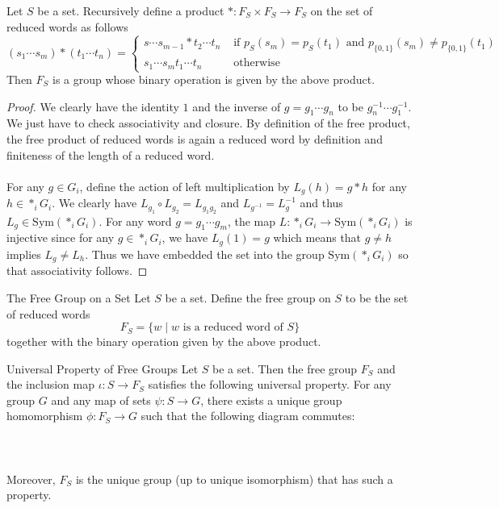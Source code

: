 \documentclass[a4paper]{article}
\begin{document}
\begin{prp}{}{} Let $S$ be a set. Recursively define a product $\ast:F_S\times F_S\to F_S$ on the set of reduced words as follows $$(s_1\cdots s_m)\ast(t_1\cdots t_n)=\begin{cases}
s\cdots s_{m-1}\ast t_2\cdots t_n & \text{ if }p_S(s_m)=p_S(t_1)\text{ and }p_{\{0,1\}}(s_m)\neq p_{\{0,1\}}(t_1)\\
s_1\cdots s_mt_1\cdots t_n& \text{ otherwise }
\end{cases}$$
Then $F_S$ is a group whose binary operation is given by the above product. \tcbline
\begin{proof}
We clearly have the identity $1$ and the inverse of $g=g_1\cdots g_n$ to be $g_n^{-1}\cdots g_1^{-1}$. We just have to check associativity and closure. By definition of the free product, the free product of reduced words is again a reduced word by definition and finiteness of the length of a reduced word. \\~\\
For any $g\in G_i$, define the action of left multiplication by $L_g(h)=g\ast h$ for any $h\in\ast_iG_i$. We clearly have $L_{g_1}\circ L_{g_2}=L_{g_1g_2}$ and $L_{g^{-1}}=L_g^{-1}$ and thus $L_g\in\text{Sym}(\ast_iG_i)$. For any word $g=g_1\cdots g_m$, the map $L:\ast_iG_i\to\text{Sym}(\ast_iG_i)$ is injective since for any $g\in\ast_iG_i$, we have $L_g(1)=g$ which means that $g\neq h$ implies $L_g\neq L_h$. Thus we have embedded the set into the group $\text{Sym}(\ast_iG_i)$ so that associativity follows. 
\end{proof}
\end{prp}

\begin{defn}{The Free Group on a Set}{} Let $S$ be a set. Define the free group on $S$ to be the set of reduced words $$F_S=\{w\;|\;w\text{ is a reduced word of }S\}$$ together with the binary operation given by the above product. 
\end{defn}

\begin{prp}{Universal Property of Free Groups}{} Let $S$ be a set. Then the free group $F_S$ and the inclusion map $\iota:S\to F_S$ satisfies the following universal property. For any group $G$ and any map of sets $\psi:S\to G$, there exists a unique group homomorphism $\phi:F_S\to G$ such that the following diagram commutes: \\~\\
 \\~\\
Moreover, $F_S$ is the unique group (up to unique isomorphism) that has such a property. \tcbline
\end{prp}
\end{document}
